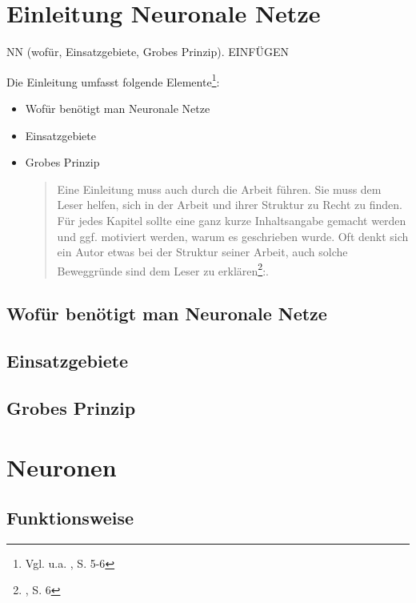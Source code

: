 \newpage
\thispagestyle{empty}
\section{Einleitung Neuronale Netze}\label{sec:einleitung_nn}   
NN (wofür, Einsatzgebiete, Grobes Prinzip). EINFÜGEN

\vspace{1cm}
\begin{tcolorbox}[title={Inhalt}]
Die Einleitung umfasst folgende Elemente\footnote{Vgl. u.a. \cite{BBoJ}, S. 5-6}:
\begin{itemize}
\item Wofür benötigt man Neuronale Netze
\item Einsatzgebiete
\item Grobes Prinzip
  \begin{quotation}
    Eine Einleitung muss auch durch die Arbeit führen. Sie muss dem Leser helfen, sich in der Arbeit und ihrer Struktur zu Recht zu finden. Für jedes Kapitel sollte eine ganz kurze Inhaltsangabe gemacht werden und ggf. motiviert werden, warum es geschrieben wurde. Oft denkt sich ein Autor etwas bei der Struktur seiner Arbeit, auch solche Beweggründe sind dem Leser zu erklären\footnote{\cite{BBoJ}, S. 6}:. 
  \end{quotation}
\end{itemize}
\end{tcolorbox}

\subsection{Wofür benötigt man Neuronale Netze}\label{subsec:einleitung_nn:wofuer_nn} 

\subsection{Einsatzgebiete}\label{subsec:einleitung_nn:einsatzgebiete}

\subsection{Grobes Prinzip}\label{subsec:einleitung_nn_grobes:prinzip}


\newpage  
\section{Neuronen}\label{sec:neuronen}
  
\newpage
\subsection{Funktionsweise}\label{subsec:neuronen:funktionsweise}
  
 
